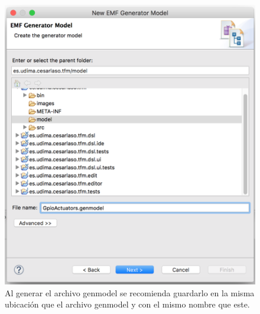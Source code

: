 \begin{figure}
	\centering
    \includegraphics[scale=0.4]{images/emf_capturas/genmodel_3.png}
    \sourcepropia{}
    \caption[Creación de un archivo genmodel desde \gls{ecore}, paso 3]{Al generar el archivo genmodel se recomienda guardarlo en la misma ubicación que el archivo genmodel y con el mismo nombre que este.}
    \label{fig:modelo_genmodel_paso3}
\end{figure}
